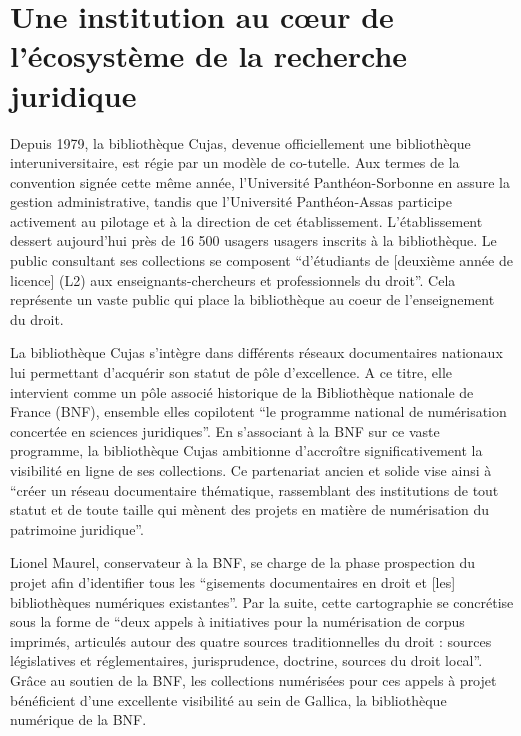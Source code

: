\section[Une institution juridique]{Une institution au cœur de l’écosystème de la recherche juridique}

Depuis 1979, la bibliothèque Cujas, devenue officiellement une bibliothèque interuniversitaire, est régie par un modèle de co-tutelle. Aux termes de la convention signée cette même année, l'Université Panthéon-Sorbonne en assure la gestion administrative, tandis que l'Université Panthéon-Assas participe activement au pilotage et à la direction de cet établissement. L'établissement dessert aujourd'hui près de 16 500 usagers usagers inscrits à la bibliothèque. Le public consultant ses collections se composent \enquote{d'étudiants de [deuxième année de licence] (L2) aux enseignants-chercheurs et professionnels du droit}. Cela représente un vaste public qui place la bibliothèque au coeur de l'enseignement du droit.

La bibliothèque Cujas s'intègre dans différents réseaux documentaires nationaux lui permettant d'acquérir son statut de pôle d'excellence. A ce titre, elle intervient comme un pôle associé historique de la Bibliothèque nationale de France (BNF), ensemble elles copilotent \enquote{le programme national de numérisation concertée en sciences juridiques}. En s'associant à la BNF sur ce vaste programme, la bibliothèque Cujas ambitionne d'accroître significativement la visibilité en ligne de ses collections. Ce partenariat ancien et solide vise ainsi à \enquote{créer un réseau documentaire thématique, rassemblant des institutions de tout statut et de toute taille qui mènent des projets en matière de numérisation du patrimoine juridique}. 

Lionel Maurel, conservateur à la BNF, se charge de la phase prospection du projet afin d'identifier tous les \enquote{gisements documentaires en droit et [les] bibliothèques numériques existantes}. Par la suite, cette cartographie se concrétise sous la forme de \enquote{deux appels à initiatives pour la numérisation de corpus imprimés, articulés autour des quatre sources traditionnelles du droit : sources législatives et réglementaires, jurisprudence, doctrine, sources du droit local}. Grâce au soutien de la BNF, les collections numérisées pour ces appels à projet bénéficient d'une excellente visibilité au sein de Gallica, la bibliothèque numérique de la BNF. 

